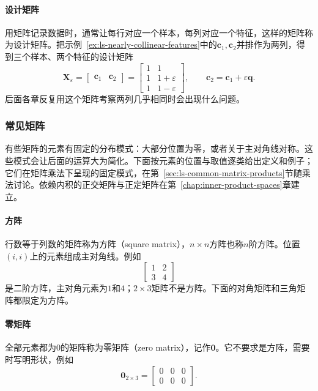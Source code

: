 \paragraph{设计矩阵}
用矩阵记录数据时，通常让每行对应一个样本，每列对应一个特征，这样的矩阵称为设计矩阵。把示例~\ref{ex:ls-nearly-collinear-features}中的$\bm c_1,\bm c_2$并排作为两列，得到三个样本、两个特征的设计矩阵
\begin{equation}
\bm X_{\varepsilon}
 =\begin{bmatrix}\bm c_1&\bm c_2\end{bmatrix}
 =\begin{bmatrix}1&1\\1&1+\varepsilon\\1&1-\varepsilon\end{bmatrix},\qquad
 \bm c_2=\bm c_1+\varepsilon\bm q.
\label{eq:linear-algebra-nearly-collinear-design}
\end{equation}
后面各章反复用这个矩阵考察两列几乎相同时会出现什么问题。

\subsubsection{常见矩阵}
\label{sec:prelim-common-matrices}

有些矩阵的元素有固定的分布模式：大部分位置为零，或者关于主对角线对称。这些模式会让后面的运算大为简化。下面按元素的位置与取值逐类给出定义和例子；它们在矩阵乘法下呈现的固定模式，在第~\ref{sec:ls-common-matrix-products}节随乘法讨论。依赖内积的正交矩阵与正定矩阵在第~\ref{chap:inner-product-spaces}章建立。

\paragraph{方阵}
行数等于列数的矩阵称为方阵（square matrix），$n\times n$方阵也称$n$阶方阵。位置$(i,i)$上的元素组成主对角线。例如
\[
 \begin{bmatrix}1&2\\3&4\end{bmatrix}
\]
是二阶方阵，主对角元素为$1$和$4$；$2\times3$矩阵不是方阵。下面的对角矩阵和三角矩阵都限定为方阵。

\paragraph{零矩阵}
全部元素都为$0$的矩阵称为零矩阵（zero matrix），记作$\bm0$。它不要求是方阵，需要时写明形状，例如
\[
 \bm0_{2\times3}=\begin{bmatrix}0&0&0\\0&0&0\end{bmatrix}.
\]

